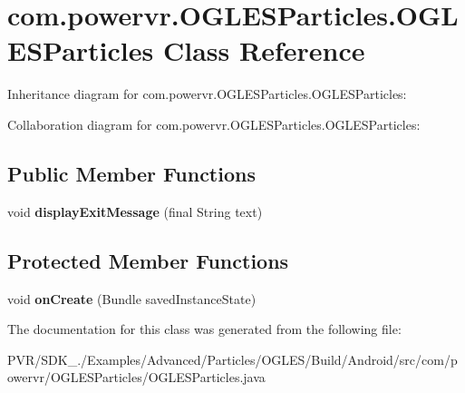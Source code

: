 \hypertarget{classcom_1_1powervr_1_1_o_g_l_e_s_particles_1_1_o_g_l_e_s_particles}{\section{com.\+powervr.\+O\+G\+L\+E\+S\+Particles.\+O\+G\+L\+E\+S\+Particles Class Reference}
\label{classcom_1_1powervr_1_1_o_g_l_e_s_particles_1_1_o_g_l_e_s_particles}
}


Inheritance diagram for com.\+powervr.\+O\+G\+L\+E\+S\+Particles.\+O\+G\+L\+E\+S\+Particles\+:


Collaboration diagram for com.\+powervr.\+O\+G\+L\+E\+S\+Particles.\+O\+G\+L\+E\+S\+Particles\+:
\subsection*{Public Member Functions}
\begin{DoxyCompactItemize}
\item 
\hypertarget{classcom_1_1powervr_1_1_o_g_l_e_s_particles_1_1_o_g_l_e_s_particles_acd0ac788f1824297daea6a358a43efd4}{void {\bfseries display\+Exit\+Message} (final String text)}\label{classcom_1_1powervr_1_1_o_g_l_e_s_particles_1_1_o_g_l_e_s_particles_acd0ac788f1824297daea6a358a43efd4}

\end{DoxyCompactItemize}
\subsection*{Protected Member Functions}
\begin{DoxyCompactItemize}
\item 
\hypertarget{classcom_1_1powervr_1_1_o_g_l_e_s_particles_1_1_o_g_l_e_s_particles_a3cad9bb28a7bafa9b647de4b10465371}{void {\bfseries on\+Create} (Bundle saved\+Instance\+State)}\label{classcom_1_1powervr_1_1_o_g_l_e_s_particles_1_1_o_g_l_e_s_particles_a3cad9bb28a7bafa9b647de4b10465371}

\end{DoxyCompactItemize}


The documentation for this class was generated from the following file\+:\begin{DoxyCompactItemize}
\item 
P\+V\+R/\+S\+D\+K\+\_./\+Examples/\+Advanced/\+Particles/\+O\+G\+L\+E\+S/\+Build/\+Android/src/com/powervr/\+O\+G\+L\+E\+S\+Particles/O\+G\+L\+E\+S\+Particles.\+java\end{DoxyCompactItemize}
